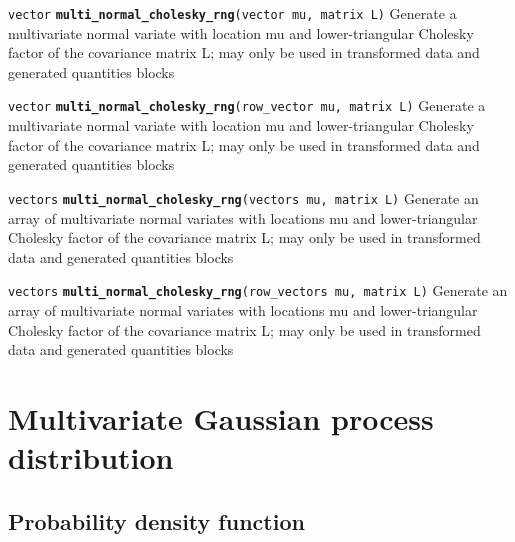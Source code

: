 \documentclass[
  10pt,
]{book}
\begin{document}

\texttt{vector} \textbf{\texttt{multi\_normal\_cholesky\_rng}}\texttt{(vector\ mu,\ matrix\ L)}\newline
Generate a multivariate normal variate with location mu and
lower-triangular Cholesky factor of the covariance matrix L; may only
be used in transformed data and generated quantities blocks


\texttt{vector} \textbf{\texttt{multi\_normal\_cholesky\_rng}}\texttt{(row\_vector\ mu,\ matrix\ L)}\newline
Generate a multivariate normal variate with location mu and
lower-triangular Cholesky factor of the covariance matrix L; may only
be used in transformed data and generated quantities blocks


\texttt{vectors} \textbf{\texttt{multi\_normal\_cholesky\_rng}}\texttt{(vectors\ mu,\ matrix\ L)}\newline
Generate an array of multivariate normal variates with locations mu
and lower-triangular Cholesky factor of the covariance matrix L; may
only be used in transformed data and generated quantities blocks


\texttt{vectors} \textbf{\texttt{multi\_normal\_cholesky\_rng}}\texttt{(row\_vectors\ mu,\ matrix\ L)}\newline
Generate an array of multivariate normal variates with locations mu
and lower-triangular Cholesky factor of the covariance matrix L; may
only be used in transformed data and generated quantities blocks

\hypertarget{multivariate-gaussian-process-distribution}{%
\section{Multivariate Gaussian process distribution}\label{multivariate-gaussian-process-distribution}}

\hypertarget{probability-density-function-28}{%
\subsection{Probability density function}\label{probability-density-function-28}}
\end{document}
